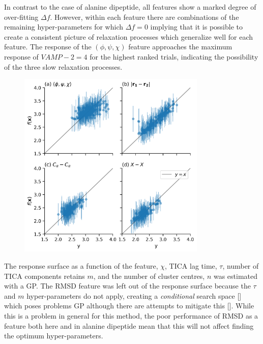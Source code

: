 In contrast to the case of alanine dipeptide, all features show a marked degree of over-fitting $\Delta f$. However, within each feature there are combinations of the remaining hyper-parameters for which $\Delta f=0$ implying that it is possible to create a consistent picture of relaxation processes which generalize well for each feature. The response of the $(\phi, \psi, \chi)$ feature  approaches the maximum response of $VAMP-2 = 4$ for the highest ranked trials, indicating the possibility of the three slow relaxation processes. 

\begin{figure}
    \centering
    \includegraphics[width=0.8\textwidth]{chapters/msm_optimization/figures/aadh_response_surface_fit_d.png}
    
    \label{fig:aadh_rsm_fit}
\end{figure}

The response surface as a function of the feature, $\chi$, TICA lag time, $\tau$, number of TICA components retains $m$, and the number of cluster centres, $n$ was estimated with a GP. The RMSD feature was left out of the response surface because the $\tau$ and $m$ hyper-parameters do not apply, creating a \emph{conditional} search space [] which  poses problems GP although there are attempts to mitigate this []. While this is a problem in general for this method, the poor performance of RMSD as a feature both here and in alanine dipeptide mean that this will not affect finding the optimum hyper-parameters. 

